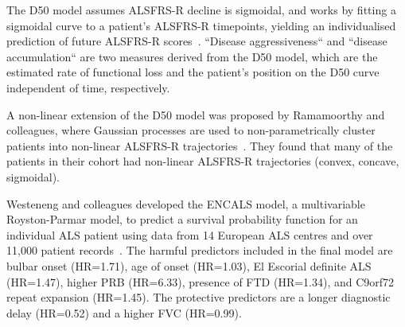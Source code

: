 The D50 model assumes ALSFRS-R decline is sigmoidal, and works by fitting a sigmoidal curve to a patient's ALSFRS-R timepoints, yielding an individualised prediction of future ALSFRS-R scores~\cite{poesenNeurofilamentMarkersALS2017, steinbachApplyingD50Disease2020}.
``Disease aggressiveness`` and ``disease accumulation`` are two measures derived from the D50 model, which are the estimated rate of functional loss and the patient's position on the D50 curve independent of time, respectively.

A non-linear extension of the D50 model was proposed by Ramamoorthy and colleagues, where Gaussian processes are used to non-parametrically cluster patients into non-linear ALSFRS-R trajectories~\cite{ramamoorthyIdentifyingPatternsAmyotrophic2022}.
They found that many of the patients in their cohort had non-linear ALSFRS-R trajectories (convex, concave, sigmoidal).

Westeneng and colleagues developed the ENCALS model, a multivariable Royston-Parmar model, to predict a survival probability function for an individual ALS patient using data from 14 European ALS centres and over 11,000 patient records~\cite{westenengPrognosisPatientsAmyotrophic2018}.
The harmful predictors included in the final model are bulbar onset (HR=1.71), age of onset (HR=1.03), El Escorial definite ALS (HR=1.47), higher PRB (HR=6.33), presence of FTD (HR=1.34), and C9orf72 repeat expansion (HR=1.45).
The protective predictors are a longer diagnostic delay (HR=0.52) and a higher FVC (HR=0.99).



